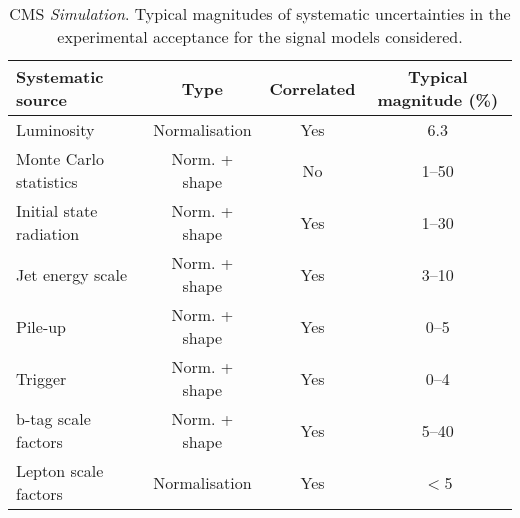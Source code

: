 \newpage
\begin{table}[h!]
  \caption{CMS {\it Simulation}. Typical magnitudes of systematic
    uncertainties in the experimental 
    acceptance for the signal models considered. 
  }
  \label{tab:signal_systs}
  \centering
  \footnotesize
  \begin{tabular}{ lccc }
    \hline
    \hline
    Systematic source              & Type          & Correlated & Typical magnitude (\%) \\
    \hline
    Luminosity                     & Normalisation & Yes        & 6.3                    \\
    Monte Carlo statistics         & Norm. + shape & No         & 1--50                  \\
    Initial state radiation        & Norm. + shape & Yes        & 1--30                  \\
    Jet energy scale               & Norm. + shape & Yes        & 3--10                  \\
    Pile-up                        & Norm. + shape & Yes        & 0--5                    \\
    Trigger                        & Norm. + shape & Yes        & 0--4                  \\
    b-tag scale factors            & Norm. + shape & Yes        & 5--40                  \\
    Lepton scale factors           & Normalisation & Yes        & $<$5                   \\
    \hline
    \hline
  \end{tabular}
\end{table}
\newpage
